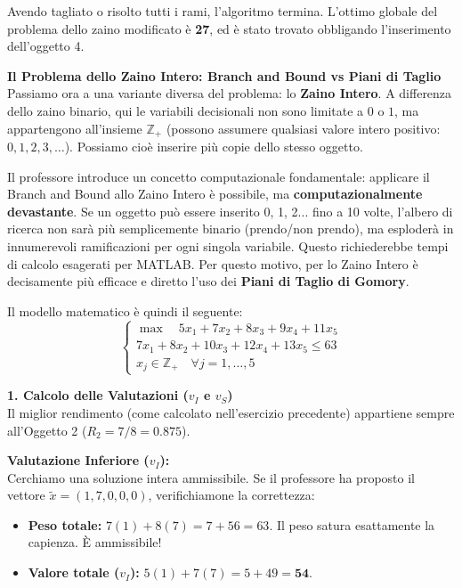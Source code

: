 \documentclass[12pt, a4paper]{article}
\begin{document}
	Avendo tagliato o risolto tutti i rami, l'algoritmo termina. L'ottimo globale del problema dello zaino modificato è \textbf{27}, ed è stato trovato obbligando l'inserimento dell'oggetto 4.
	
	\vspace{0.6cm}
	\textbf{Il Problema dello Zaino Intero: Branch and Bound vs Piani di Taglio}\\
	Passiamo ora a una variante diversa del problema: lo \textbf{Zaino Intero}. A differenza dello zaino binario, qui le variabili decisionali non sono limitate a $0$ o $1$, ma appartengono all'insieme $\mathbb{Z}_+$ (possono assumere qualsiasi valore intero positivo: $0, 1, 2, 3, \dots$). Possiamo cioè inserire più copie dello stesso oggetto.
	
	Il professore introduce un concetto computazionale fondamentale: applicare il Branch and Bound allo Zaino Intero è possibile, ma \textbf{computazionalmente devastante}. Se un oggetto può essere inserito 0, 1, 2... fino a 10 volte, l'albero di ricerca non sarà più semplicemente binario (prendo/non prendo), ma esploderà in innumerevoli ramificazioni per ogni singola variabile. Questo richiederebbe tempi di calcolo esagerati per MATLAB. Per questo motivo, per lo Zaino Intero è decisamente più efficace e diretto l'uso dei \textbf{Piani di Taglio di Gomory}.
	
	Il modello matematico è quindi il seguente:
	\[
	\begin{cases} 
		\max \quad 5x_1 + 7x_2 + 8x_3 + 9x_4 + 11x_5 \\ 
		7x_1 + 8x_2 + 10x_3 + 12x_4 + 13x_5 \leq 63 \\ 
		x_j \in \mathbb{Z}_+ \quad \forall j = 1, \dots, 5 
	\end{cases}
	\]
	
	\vspace{0.4cm}
	\textbf{1. Calcolo delle Valutazioni ($v_I$ e $v_S$)}\\
	Il miglior rendimento (come calcolato nell'esercizio precedente) appartiene sempre all'Oggetto 2 ($R_2 = 7/8 = 0.875$).
	
	\textbf{Valutazione Inferiore ($v_I$):}\\
	Cerchiamo una soluzione intera ammissibile. Se il professore ha proposto il vettore $\tilde{x} = (1, 7, 0, 0, 0)$, verifichiamone la correttezza:
	\begin{itemize}[label=$\circ$, itemsep=2pt, leftmargin=1.5cm]
		\item \textbf{Peso totale:} $7(1) + 8(7) = 7 + 56 = 63$. Il peso satura esattamente la capienza. È ammissibile!
		\item \textbf{Valore totale ($v_I$):} $5(1) + 7(7) = 5 + 49 = \mathbf{54}$.
	\end{itemize}
	
\end{document}
